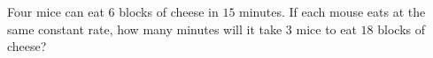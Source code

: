 Four mice can eat $6$ blocks of cheese in $15$ minutes. If each mouse eats at the same constant rate, how many minutes will it take $3$ mice to eat $18$ blocks of cheese?
